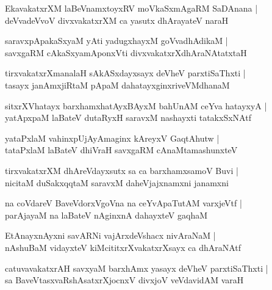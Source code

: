 \documentclass[twoside,12pt,openright]{book}
\newcounter{shloka}[chapter]
\begin{document}
\begin{shloka}%
EkavakatxrXM laBeVnamxtoyxRV moVkaSxmAgaRM SaDAnana |\\
deVvadeVvoV divxvakatxrXM ca yasutx dhArayateV naraH
\end{shloka}

\begin{shloka}%
saravxpApakaSxyaM yAti yadugxhayxM goVvadhAdikaM |\\
savxgaRM cAkaSxyamAponxVti divxvakatxrXdhAraNAtatxtaH 
\end{shloka}

\begin{shloka}%
tirxvakatxrXmanalaH sAkASxdayxsayx deVheV parxtiSaThxti |\\
tasayx janAmxjiRtaM pApaM dahatayxginxriveVMdhanaM 
\end{shloka}

\begin{shloka}%
sitxrXVhatayx barxhamxhatAyxBAyxM bahUnAM ceYva hatayxyA |\\
yatApxpaM laBateV dutaRyxH saravxM nashayxti tatakxSxNAtf
\end{shloka}

\begin{shloka}%
yataPxlaM vahinxpUjAyAmaginx kAreyxV GaqtAhutw |\\
tataPxlaM laBateV dhiVraH savxgaRM cAnaMtamashunxteV 
\end{shloka}

\begin{shloka}%
tirxvakatxrXM dhAreVdayxsutx sa ca barxhamxsamoV Buvi |\\
nicitaM duSakxqqtaM saravxM daheVjajxnamxni janamxni
\end{shloka}

\begin{shloka}%
na coVdareV BaveVdorxVgoVna na ceYvApaTutAM varxjeVtf |\\
parAjayaM na laBateV nAginxnA dahayxteV gaqhaM  
\end{shloka}

\begin{shloka}%
EtAnayxnAyxni savARNi vajArxdeVshacx nivAraNaM |\\
nAshuBaM vidayxteV kiMcititxrXvakatxrXsayx ca dhAraNAtf 
\end{shloka}

\begin{shloka}%
catuvavakatxrAH savxyaM barxhAmx yasayx deVheV parxtiSaThxti |\\
sa BaveVtasxvaRshAsatxrXjocnxV divxjoV veVdavidAM varaH 
\end{shloka}
\end{document}
